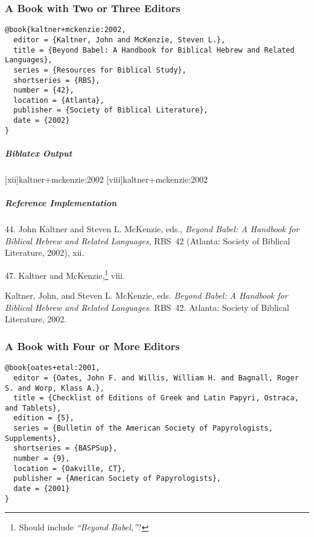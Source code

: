 \documentclass[a4paper]{article}
\newenvironment{biboutput}{%
  \subparagraph{Biblatex Output}
}{\color{black}}
\newenvironment{refimp}{%
  \subparagraph{Reference Implementation}
  \color{reference-colour}
  \rm
}{\par\color{black}}
\begin{document}
\subsubsection{A Book with Two or Three Editors}

\begin{lstlisting}
@book{kaltner+mckenzie:2002,
  editor = {Kaltner, John and McKenzie, Steven L.},
  title = {Beyond Babel: A Handbook for Biblical Hebrew and Related Languages},
  series = {Resources for Biblical Study},
  shortseries = {RBS},
  number = {42},
  location = {Atlanta},
  publisher = {Society of Biblical Literature},
  date = {2002}
}
\end{lstlisting}  

\begin{biboutput}
  [xii]{kaltner+mckenzie:2002}
  [viii]{kaltner+mckenzie:2002}
\end{biboutput}

\begin{refimp}
  \hspace*{\bibindent}44. John Kaltner and Steven L. McKenzie, eds.,
  \emph{Beyond Babel: A Handbook for Biblical Hebrew and Related Languages,}
  RBS~42 (Atlanta: Society of Biblical Literature, 2002), xii.

  \hspace*{\bibindent}47. Kaltner and McKenzie,\footnote{Should include
  \emph{“Beyond Babel,”}?} viii.

  \hangindent\bibindent Kaltner, John, and Steven L. McKenzie, eds.
  \emph{Beyond Babel: A Handbook for Biblical Hebrew and Related Languages.}
  RBS~42. Atlanta: Society of Biblical Literature, 2002.

\end{refimp}

\subsubsection{A Book with Four or More Editors}

\begin{lstlisting}
@book{oates+etal:2001,
  editor = {Oates, John F. and Willis, William H. and Bagnall, Roger S. and Worp, Klass A.},
  title = {Checklist of Editions of Greek and Latin Papyri, Ostraca, and Tablets},
  edition = {5},
  series = {Bulletin of the American Society of Papyrologists, Supplements},
  shortseries = {BASPSup},
  number = {9},
  location = {Oakville, CT},
  publisher = {American Society of Papyrologists},
  date = {2001}
}
\end{lstlisting}  
\end{document}
